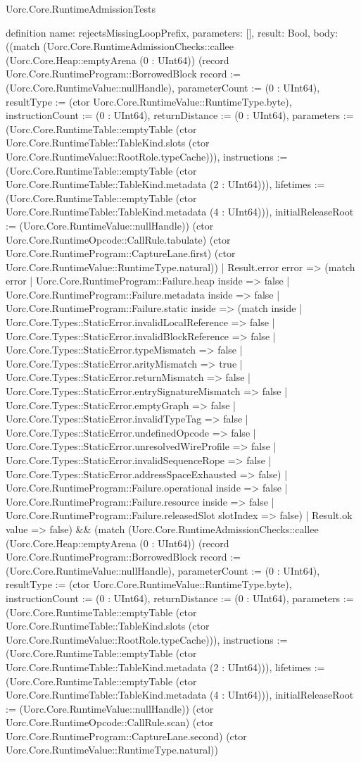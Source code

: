 \begin{lexlean}{Uorc.Core.RuntimeAdmissionTests}
\begin{semanticmodule}
definition{
  name: rejectsMissingLoopPrefix,
  parameters: [],
  result: Bool,
  body: ((match (Uorc.Core.RuntimeAdmissionChecks::callee (Uorc.Core.Heap::emptyArena (0 : UInt64)) (record Uorc.Core.RuntimeProgram::BorrowedBlock {record := (Uorc.Core.RuntimeValue::nullHandle), parameterCount := (0 : UInt64), resultType := (ctor Uorc.Core.RuntimeValue::RuntimeType.byte), instructionCount := (0 : UInt64), returnDistance := (0 : UInt64), parameters := (Uorc.Core.RuntimeTable::emptyTable (ctor Uorc.Core.RuntimeTable::TableKind.slots (ctor Uorc.Core.RuntimeValue::RootRole.typeCache))), instructions := (Uorc.Core.RuntimeTable::emptyTable (ctor Uorc.Core.RuntimeTable::TableKind.metadata (2 : UInt64))), lifetimes := (Uorc.Core.RuntimeTable::emptyTable (ctor Uorc.Core.RuntimeTable::TableKind.metadata (4 : UInt64))), initialReleaseRoot := (Uorc.Core.RuntimeValue::nullHandle)}) (ctor Uorc.Core.RuntimeOpcode::CallRule.tabulate) (ctor Uorc.Core.RuntimeProgram::CaptureLane.first) (ctor Uorc.Core.RuntimeValue::RuntimeType.natural))
    | Result.error error => (match error
      | Uorc.Core.RuntimeProgram::Failure.heap inside => false
      | Uorc.Core.RuntimeProgram::Failure.metadata inside => false
      | Uorc.Core.RuntimeProgram::Failure.static inside => (match inside
        | Uorc.Core.Types::StaticError.invalidLocalReference => false
        | Uorc.Core.Types::StaticError.invalidBlockReference => false
        | Uorc.Core.Types::StaticError.typeMismatch => false
        | Uorc.Core.Types::StaticError.arityMismatch => true
        | Uorc.Core.Types::StaticError.returnMismatch => false
        | Uorc.Core.Types::StaticError.entrySignatureMismatch => false
        | Uorc.Core.Types::StaticError.emptyGraph => false
        | Uorc.Core.Types::StaticError.invalidTypeTag => false
        | Uorc.Core.Types::StaticError.undefinedOpcode => false
        | Uorc.Core.Types::StaticError.unresolvedWireProfile => false
        | Uorc.Core.Types::StaticError.invalidSequenceRope => false
        | Uorc.Core.Types::StaticError.addressSpaceExhausted => false)
      | Uorc.Core.RuntimeProgram::Failure.operational inside => false
      | Uorc.Core.RuntimeProgram::Failure.resource inside => false
      | Uorc.Core.RuntimeProgram::Failure.releasedSlot slotIndex => false)
    | Result.ok value => false) && (match (Uorc.Core.RuntimeAdmissionChecks::callee (Uorc.Core.Heap::emptyArena (0 : UInt64)) (record Uorc.Core.RuntimeProgram::BorrowedBlock {record := (Uorc.Core.RuntimeValue::nullHandle), parameterCount := (0 : UInt64), resultType := (ctor Uorc.Core.RuntimeValue::RuntimeType.byte), instructionCount := (0 : UInt64), returnDistance := (0 : UInt64), parameters := (Uorc.Core.RuntimeTable::emptyTable (ctor Uorc.Core.RuntimeTable::TableKind.slots (ctor Uorc.Core.RuntimeValue::RootRole.typeCache))), instructions := (Uorc.Core.RuntimeTable::emptyTable (ctor Uorc.Core.RuntimeTable::TableKind.metadata (2 : UInt64))), lifetimes := (Uorc.Core.RuntimeTable::emptyTable (ctor Uorc.Core.RuntimeTable::TableKind.metadata (4 : UInt64))), initialReleaseRoot := (Uorc.Core.RuntimeValue::nullHandle)}) (ctor Uorc.Core.RuntimeOpcode::CallRule.scan) (ctor Uorc.Core.RuntimeProgram::CaptureLane.second) (ctor Uorc.Core.RuntimeValue::RuntimeType.natural))
}
\end{semanticmodule}
\end{lexlean}
